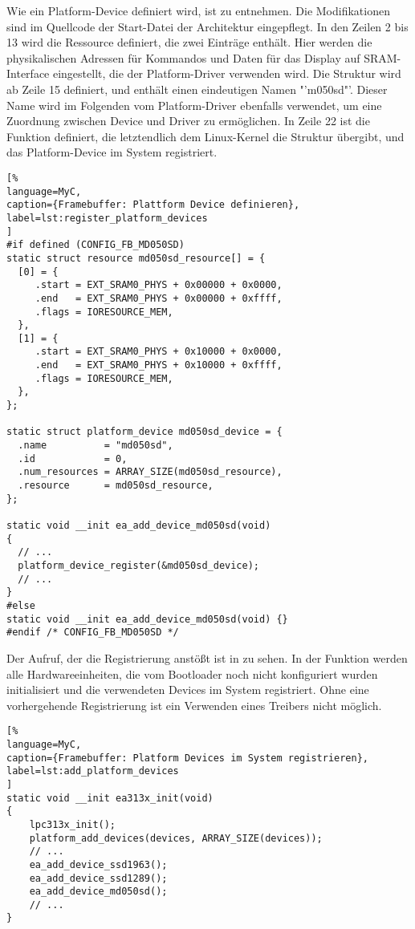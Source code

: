 Wie ein Platform-Device definiert wird, ist  zu entnehmen. Die Modifikationen sind im Quellcode der Start-Datei der Architektur  eingepflegt. In den Zeilen 2 bis 13 wird die Ressource  definiert, die zwei Einträge enthält. Hier werden die physikalischen Adressen für Kommandos und Daten  für das Display auf SRAM-Interface eingestellt, die der Platform-Driver verwenden wird. Die Struktur  wird ab Zeile 15 definiert, und enthält einen eindeutigen Namen "'m050sd"'. Dieser Name wird im Folgenden vom Platform-Driver ebenfalls verwendet, um eine Zuordnung zwischen Device und Driver zu ermöglichen.
In Zeile 22 ist die Funktion definiert, die letztendlich dem Linux-Kernel die Struktur  übergibt, und das Platform-Device im System registriert. 
\begin{lstlisting}[%
language=MyC,
caption={Framebuffer: Plattform Device definieren},
label=lst:register_platform_devices
]
#if defined (CONFIG_FB_MD050SD)
static struct resource md050sd_resource[] = {
  [0] = {
     .start = EXT_SRAM0_PHYS + 0x00000 + 0x0000,
     .end   = EXT_SRAM0_PHYS + 0x00000 + 0xffff,
     .flags = IORESOURCE_MEM,
  },
  [1] = {
     .start = EXT_SRAM0_PHYS + 0x10000 + 0x0000,
     .end   = EXT_SRAM0_PHYS + 0x10000 + 0xffff,
     .flags = IORESOURCE_MEM,
  },
};

static struct platform_device md050sd_device = {
  .name          = "md050sd",
  .id            = 0,
  .num_resources = ARRAY_SIZE(md050sd_resource),
  .resource      = md050sd_resource,
};

static void __init ea_add_device_md050sd(void)
{
  // ...
  platform_device_register(&md050sd_device);
  // ...
}
#else
static void __init ea_add_device_md050sd(void) {}
#endif /* CONFIG_FB_MD050SD */
\end{lstlisting}
Der Aufruf, der die Registrierung anstößt ist in  zu sehen. In der Funktion  werden alle Hardwareeinheiten, die vom Bootloader noch nicht konfiguriert wurden initialisiert und die verwendeten Devices im System registriert. Ohne eine vorhergehende Registrierung ist ein Verwenden eines Treibers nicht möglich.

\begin{lstlisting}[%
language=MyC,
caption={Framebuffer: Platform Devices im System registrieren},
label=lst:add_platform_devices
]
static void __init ea313x_init(void)
{
	lpc313x_init();
	platform_add_devices(devices, ARRAY_SIZE(devices));
    // ...
	ea_add_device_ssd1963();
	ea_add_device_ssd1289();
	ea_add_device_md050sd();
	// ...
}
\end{lstlisting}

